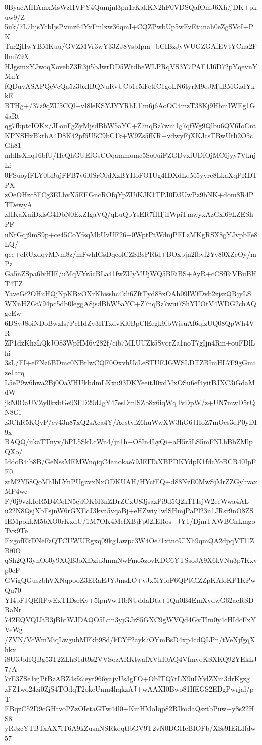 0ByacAfHAmxMsWzHVPY4Qumjnl3pn1rKakKN2hF0VDSQafOmJ6Xh/jDK+pkuw9/Z
5uk/7L7bjsYcbIjsPvmz64YxFmlxw36qmI+CQZPwbUp5wFvEtunah0eZgSVoI+PK
Tur2jHwYBMKuu/GVZMVr3wY33ZJ8VsbIpm+bCIBzJyWUGZGAfEVtYCna2F0miZ9X
HJgsmxYJwoqXovebZ3R3ji5bJwrDD5WtdbeWLPRqVS3Y7PAF1J6D72pYqevnYMnY
fQDuvASAPQeVcQa5z3bxIBQNuRvUCb1e5iFetfC1goLN6tyrM9qJMjlBMGzdYkkE
BTHg+/37z9qZU5CQl+vl8leKSYJYYRhL1lm6j6AoOC4mzT38Kj9HbmIWEg1G4aRt
qg7fbptcIOKx/JLouFgZyMjsdBbW5aYC+Z7nqBz7wui1g7qfWg9Qlbu6QV6IoCnt
KPNSHxBkthA4D8K42pf6U5C9bC1k+W9Zs5fKR+vdwyFjXKJcsTBwUtli2O5cGh81
mldIsXhqJ6bfU/HcQhGUEfGsCOqammomc5So0uiFZGDvxfUDfOjMC6jyy7VknjLi
0FSuoyfFLY0bBujFFB7v6i0SrC0dXzBYHoFO1Ug4IDXdLqM5yyrc8LkaXqPRDTPX
zOeOHzc8FCg3ELbvX5EEGncROfqYpZUiKJK1TPJ0D3UwPz9bNK+dom8R4PTDewyA
zHKaXuiDxlsG4DbN0ExZIgaVQ/qLuQpYsER7fHIjiIWpiTmwyxAzGxi69LZEShPF
uNrGqj9mS9p+ce45CoYfsqMbUvUF26+0WptPtWdnjPFLzMKgRSX8gYJvpbFe8LQ/
qee+eRUxdqvMNm8z/mFwhIGsDqeolCZSBsPRtd+BOxbjn2fbvf2Yv80XZeOy/mPz
Ga5nZSpa6lvHIE/uMqVYr5cBLa41fwZUyMUjWQ5BEiBS+AyR+cCSfEiVBuBHT4TZ
YaveGf2OHuHQjNpKBxOXrKhisshc4kli6ZftTyd88xOAh09lWfDvb2zjszQRjyLS
WXnHZGt794pc5db0leggA8jsdBbW5aYC+Z7nqBz7wui7ShYUOtV4WDG2chAQgcEw
6DSyJ8oiNDoBwzIs/PcHdZv3HTxdvKi0BpClEegk9fbWisuAf6qfzUQ08QpWh4VR
ZP1dzKhzLQkJO83WpHM6y282f/cib7MLUUZk5SvqrZa1noT7gIjn4Rm+ouFDlLhi
3sL/FI+eFNz6BDmc0NBrlwCQF0OxvhUcLeSTUFJGWSLDTZBImHL7F9gGmize1arq
L5eP9w6hwa2Bj0OaVHUkbdmLKxu93DKYeeitJ0xdMxOSu6ef4yitBJXC3iGdaMdW
jkN0OaUVZy0kxbGe93FD29dJgY47esDmlSZb8x6iqWqTvDpW/z+UN7mwD5rQN8Gi
z3ChR5KQvP/ev43n87xQ2sAca4Y/AqstvlZ6huWwXW3hG6JHoZ7mOes3qP0yDI9x
BAQQ/ukaTTnyv/bPL5SkLcWn4/jn1h+O8In4LyQi+aH5r5LS5mFNLhBbZMlpQXo/
IddoB4ib8B/GeNssMEMWnqiqC4anokae79JEITaXBPDKYdpK1fdcYoBCR40IpFF0
ztM2Y58QoMhIhLYnPUgzvxNxODKUAH/HYcfEQ+d88NzE0MwSjMrZZGyhvaxMP4wc
F/0j9vzkIoR5D4CoIN5cjlOK6I3nZDrZCxU83jsazPi9d5Q2k1TIsjW2eeWwa4AL
u22N8QsjXbEsjnW6rGXEcJ3kva5vqaBj+eHZwiy1wlSHmjPaPl23u1JRsr9nO8ZS
IEMpokkM5bXO0rKxdU/1M7OK4McfXBjFp02fERos+JY1/DjmTXWBCnLmgoTvx9Te
ExgofEkDNeFzQTCUWURgxq09kg1awpc3W4Oe71xtnoUlXh9qmQA2dpqVTl1ZBf0O
qSh2QJ3ynOo0y9XQB3oXDziu3mmNwFmo5zovKDC6YTSsoJA9X6kVNu3p7Kxvp0eF
GVigQGuszbhVXNqpooZ3ERaEJYJmsLO+vJx5iYioF6QPtCiZZpKAloKP1KPwQu70
YI4bFJQEfIPwExTIDsrKv+5lpnVwTlbNUddaDta+1Qn0B4EmXvdwG62acRSDRaNr
742EQVQIJtB3jBhtWJDAQO5Lnn3yjGJrS5GXC9gWVQd4GvTlm0y4cHIdcFxYVeWg
/ZVN/VcWmMiqLwguhMFkb9Sd/kEYff2ayk7OYmBsD4xp4cdQLPn/tVeXjfgqXhkx
i8U3JoHQBg53T2ZLhS1dt9s2VVSozARKtwafXVhI0AQ4VfmvqKSXKQ92YEkLJ7/A
7rE3ZSe1vjPtBzABZ4sfs7eyt966yajvUs3gFO+ObITQ7tLX9uLYvlZXm3drKgzg
zFZ1wo24zi0ZjS4TOdqT2okeUnm4hqkzAJ+wAAXI0Bwo81IfEGS2EDgPwrjal/pT
EBqzC52D9cGHtvoPZzOIetaGTw44l0+KmHMoIqp82RIkodaQsztbPuw+y8s22HS8
yRJzcYTBTxAX7iT6A9kZusnNSRkqqtlbGV9T2vN0DGHeBIOFb/XSs9IEiLIfdw57
